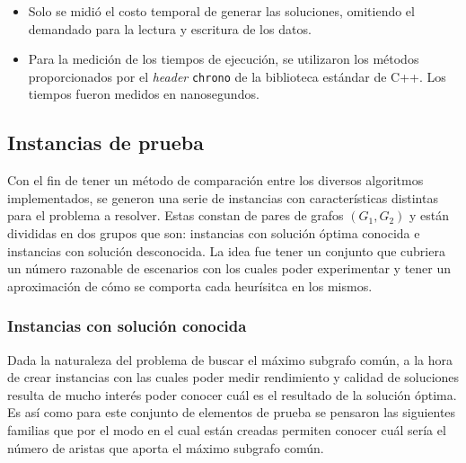\begin{enumerate}[label=(\roman*)]
\begin{itemize}
\item Solo se midió el costo temporal de generar las soluciones,
omitiendo el demandado para la lectura y escritura de los datos.
\item Para la medición de los tiempos de ejecución, se utilizaron los
métodos proporcionados por el \emph{header} \texttt{chrono} de la
biblioteca estándar de C++. Los tiempos fueron medidos en nanosegundos.
\end{itemize}

\end{enumerate}

\subsection*{Instancias de prueba}

Con el fin de tener un método de comparación entre los diversos algoritmos
implementados, se generon una serie de instancias con características distintas
para el problema a resolver. Estas constan de pares de grafos $(G_1,
G_2)$ y están divididas en dos grupos que son: instancias con solución óptima
conocida e instancias con solución desconocida. La idea fue tener un conjunto
que cubriera un número razonable de escenarios con los cuales poder
experimentar y tener un aproximación de cómo se comporta cada heurísitca en los
mismos.

\subsubsection*{Instancias con solución conocida}

Dada la naturaleza del problema de buscar el máximo subgrafo común, a la hora de
crear instancias con las cuales poder medir rendimiento y calidad de soluciones
resulta de mucho interés poder conocer cuál es el resultado de la solución
óptima. Es así como para este conjunto de elementos de prueba se pensaron las
siguientes familias que por el modo en el cual están creadas permiten conocer
cuál sería el número de aristas que aporta el máximo subgrafo común.

